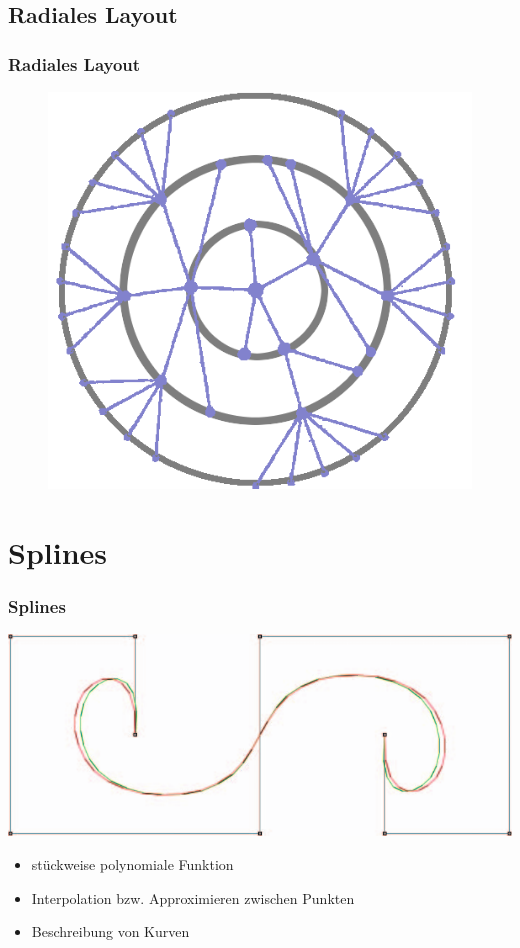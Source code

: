 \documentclass[11pt]{beamer}
\begin{document}
\subsection{Radiales Layout}
\begin{frame}
\frametitle{Radiales Layout}
\begin{figure}
\centering
\includegraphics[width=0.6\linewidth]{./RadialTree.png}
\end{figure}
\end{frame}

\section{Splines}
\begin{frame}
\frametitle{Splines}
\includegraphics[width=0.6\linewidth]{./Splines.png}
\begin{itemize}
\item stückweise polynomiale Funktion
\item Interpolation bzw. Approximieren zwischen Punkten
\item Beschreibung von Kurven
\end{itemize}

\end{frame}
\end{document}
